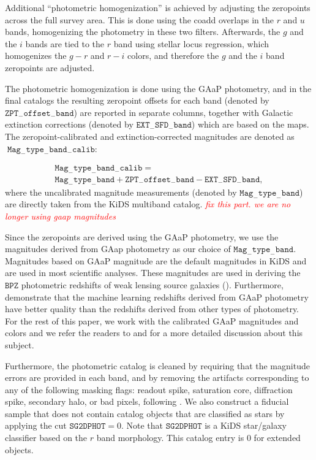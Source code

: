 \documentclass[fleqn,usenatbib]{mnras}
\newcommand{\todo}[1]{{\em \textcolor{red}{ #1}}}
\begin{document}
Additional ``photometric homogenization'' is achieved by adjusting the zeropoints across the full survey area. This is done using the coadd overlaps in the $r$ and $u$ bands, homogenizing the photometry in these two filters. Afterwards, the $g$ and the $i$ bands are tied to the $r$ band using stellar locus regression, which homogenizes the $g − r$ and $r − i$ colors, and therefore the $g$ and the $i$ band zeropoints are adjusted.

The photometric homogenization is done using the GAaP photometry, and in the final catalogs the resulting zeropoint offsets for each band (denoted by $\mathtt{ZPT}_{-}\mathtt{offset}_{-}\mathtt{band}$) are reported
in separate columns, together with Galactic extinction corrections (denoted by $\mathtt{EXT}_{-}\mathtt{SFD}_{-}\mathtt{band}$) which are based on the \citealt{schlegel98} maps. The zeropoint-calibrated and extinction-corrected magnitudes are denoted as $\; \mathtt{Mag}_{-}\mathtt{type}_{-}\mathtt{band}_{-}\mathtt{calib}$:

\begin{eqnarray}
\mathtt{Mag}_{-}\mathtt{type}_{-}\mathtt{band}_{-}\mathtt{calib} =  \nonumber\\
\mathtt{Mag}_{-}\mathtt{type}_{-}\mathtt{band} + \mathtt{ZPT}_{-}\mathtt{offset}_{-}\mathtt{band} - \mathtt{EXT}_{-}\mathtt{SFD}_{-}\mathtt{band}, 
\end{eqnarray}
where the uncalibrated magnitude measurements (denoted by $\mathtt{Mag}_{-}\mathtt{type}_{-}\mathtt{band}$) are directly taken from the KiDS multiband catalog.  
\todo{fix this part. we are no longer using gaap magnitudes}


Since the zeropoints are derived using the GAaP photometry, we use the magnitudes derived from GAap photometry as our choice of $\mathtt{Mag}_{-}\mathtt{type}_{-}\mathtt{band}$. Magnitudes based on GAaP magnitude are the default magnitudes in KiDS and are used in most scientific analyses. These magnitudes are used in deriving the $\mathtt{BPZ}$ photometric redshifts of weak lensing source galaxies (\citealt{kuijken2015}). Furthermore, \citealt{kids_annz} demonstrate that the machine learning redshifts derived from GAaP photometry have better quality than the redshifts derived from other types of photometry. For the rest of this paper, we work with the calibrated GAaP magnitudes and colors and we refer the readers to \citealt{kuijken2015} and \citealt{kids_dr3} for a more detailed discussion about this subject.

Furthermore, the photometric catalog is cleaned by requiring that the magnitude errors are provided in each band, and by removing the artifacts corresponding to any of the following masking flags: readout spike, saturation core, diffraction spike, secondary halo, or bad pixels, following \citealt{kids_dr3, radovich2017}. We also construct a fiducial sample that does not contain catalog objects that are classified as stars by applying the cut $\mathtt{SG2DPHOT}=0$. Note that $\mathtt{SG2DPHOT}$ is a KiDS star/galaxy classifier based on the $r$ band morphology. This catalog entry is 0 for extended objects.
\end{document}
